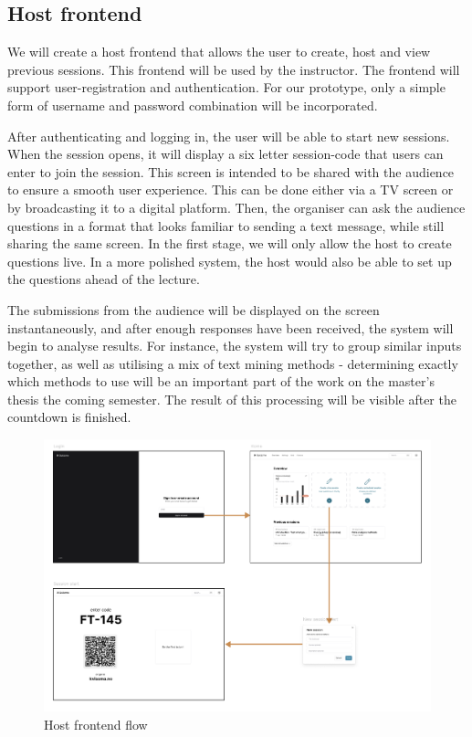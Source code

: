 \subsection{Host frontend}
We will create a host frontend that allows the user to create, host and view previous sessions. This frontend will be used by the instructor. The frontend will support user-registration and authentication. For our prototype, only a simple form of username and password combination will be incorporated.

After authenticating and logging in, the user will be able to start new sessions. When the session opens, it will display a six letter session-code that users can enter to join the session. This screen is intended to be shared with the audience to ensure a smooth user experience. This can be done either via a TV screen or by broadcasting it to a digital platform. Then, the organiser can ask the audience questions in a format that looks familiar to sending a text message, while still sharing the same screen. In the first stage, we will only allow the host to create questions live. In a more polished system, the host would also be able to set up the questions ahead of the lecture.

The submissions from the audience will be displayed on the screen instantaneously, and after enough responses have been received, the system will begin to analyse results. For instance, the system will try to group similar inputs together, as well as utilising a mix of text mining methods - determining exactly which methods to use will be an important part of the work on the master's thesis the coming semester. The result of this processing will be visible after the countdown is finished.

\clearpage
\begin{figure}[h!]
    \centering
    \includegraphics[width=1\linewidth]{figures//c5/host-frontend.png}
    \caption{Host frontend flow}
    \label{fig:host-frontend-flow}
\end{figure}

